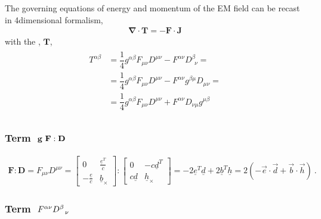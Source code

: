 \documentclass[letterpaper,10pt,english]{jupyterBook}
\begin{document}
\sphinxAtStartPar
The governing equations of energy and momentum of the EM field can be recast in 4\sphinxhyphen{}dimensional formalism,
\begin{equation*}
\begin{split}\symbf{\nabla} \cdot \mathbf{T} = - \mathbf{F} \cdot \mathbf{J}\end{split}
\end{equation*}
\sphinxAtStartPar
with the , \(\mathbf{T}\),
\begin{equation}\label{equation:ch/relativity-special/notes:eq:energy-momentum-tensor:0}
\begin{split}\begin{aligned}
  T^{\alpha \beta} & = \dfrac{1}{4} g^{\alpha \beta} F_{\mu \nu} D^{\mu \nu} - F^{\alpha \nu} D^{\beta}_{\ \ \nu} = \\
                   & = \dfrac{1}{4} g^{\alpha \beta} F_{\mu \nu} D^{\mu \nu} - F^{\alpha \nu} g^{\beta \mu} D_{\mu \nu} = \\
                   & = \dfrac{1}{4} g^{\alpha \beta} F_{\mu \nu} D^{\mu \nu} + F^{\alpha \nu} D_{\nu \mu} g^{\mu \beta} \\
\end{aligned}\end{split}
\end{equation}\subsubsection*{Term \protect\(\ \mathbf{g} \ \mathbf{F} : \mathbf{D} \protect\)}
\begin{equation}\label{equation:ch/relativity-special/notes:eq:energy-momentum-tensor:1}
\begin{split}\mathbf{F} : \mathbf{D} = F_{\mu \nu} D^{\mu \nu} =
  \begin{bmatrix} 0 & \frac{\underline{e}^T}{c} \\ -\frac{\underline{e}}{c} & \underline{b}_{\times} \end{bmatrix} :
  \begin{bmatrix} 0 & -c \underline{d}^T \\ c \underline{d} & \underline{h}_{\times} \end{bmatrix} = - 2 \underline{e}^T \underline{d} + 2 \underline{b}^T \underline{h} = 2 \left( - \vec{e} \cdot \vec{d} + \vec{b} \cdot \vec{h} \right) \ .
\end{split}
\end{equation}\subsubsection*{Term \protect\(\ F^{\alpha \nu} D^{\beta}_{\ \ \nu}\protect\)}
\end{document}

